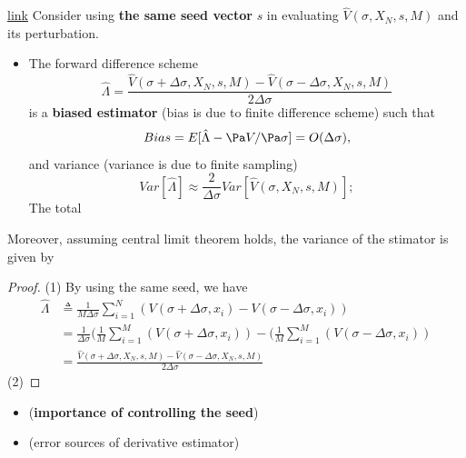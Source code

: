 \begin{refsection}
\begin{lemma}\href{https://quant.stackexchange.com/questions/3329/how-to-get-greeks-using-monte-carlo-for-arbitrary-option}{link}\cite[385]{glasserman2003monte}
Consider using \textbf{the same seed vector} $s$ in evaluating $\hat{V}(\sigma, X_N, s, M)$ and its perturbation. 
\begin{itemize}
	\item The forward difference scheme $$\hat{\Lambda} = \frac{\hat{V}(\sigma+\Delta \sigma, X_N, s, M) - \hat{V}(\sigma-\Delta \sigma, X_N, s, M) }{2\Delta \sigma}$$
	is a \textbf{biased estimator} (bias is due to finite difference scheme) such that
	 $$Bias = E[\hat{\Lambda} - \Pa V /\Pa \sigma] = O(\Delta \sigma),$$
	 and
	 variance (variance is due to finite sampling)
	 $$Var[\hat{\Lambda}] \approx \frac{2}{\Delta \sigma} Var[\hat{V}(\sigma, X_N, s, M)];$$
	 The total 
\end{itemize}




Moreover, assuming central limit theorem holds, the variance of the stimator is given by
	
\end{lemma}
\begin{proof}
(1)	
 By using the same seed, we have
\begin{align*}
\hat{\Lambda} &\triangleq \frac{1}{M \Delta \sigma}\sum_{i=1}^N(V(\sigma +　\Delta \sigma, x_i) - V(\sigma -　\Delta \sigma, x_i)) \\
&=\frac{1}{\Delta \sigma} (\frac{1}{M }\sum_{i=1}^M(V(\sigma +　\Delta \sigma, x_i)) - (\frac{1}{M }\sum_{i=1}^M (V(\sigma -　\Delta \sigma, x_i)) \\
&=\frac{\hat{V}(\sigma+\Delta \sigma, X_N, s, M) - \hat{V}(\sigma-\Delta \sigma, X_N, s, M) }{2\Delta \sigma}
\end{align*}
(2)
\end{proof}



\begin{note}[interpretation]\hfill
\begin{itemize}
	\item (\textbf{importance of controlling the seed})
	\item (error sources of derivative estimator)
\end{itemize}
\end{note}



\begin{method}
	

\end{method}
\end{refsection}
